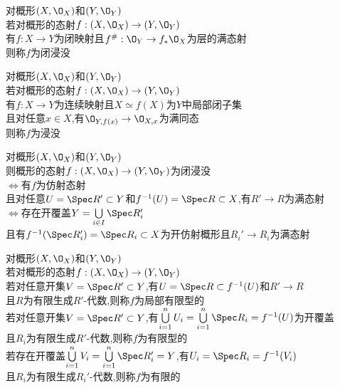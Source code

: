 \begin{dingyi}
对概形$(X,\O_{X})$和$(Y,\O_{Y})$\\
若对概形的态射$f:(X,\O_{X})\to (Y,\O_{Y})$\\
有$f:X\to Y$为闭映射且$f^{\#}:\O_{Y}\to f_{*}\O_{X}$为层的满态射\\
则称$f$为闭浸没
\end{dingyi}

\begin{dingyi}
对概形$(X,\O_{X})$和$(Y,\O_{Y})$\\
若对概形的态射$f:(X,\O_{X})\to (Y,\O_{Y})$\\
有$f:X\to Y$为连续映射且$X\simeq f(X)$为$Y$中局部闭子集\\
且对任意$x\in X$,有$\O_{Y,f(x)}\to\O_{X,x}$为满同态\\
则称$f$为浸没
\end{dingyi}

\begin{dingli}
对概形$(X,\O_{X})$和$(Y,\O_{Y})$\\
则概形的态射$f:(X,\O_{X})\to (Y,\O_{Y})$为闭浸没\\
$\Leftrightarrow$有$f$为仿射态射\\
且对任意$U=\Spec R'\subset Y$和$f^{-1}(U)=\Spec R\subset X$,有$R'\to R$为满态射\\
$\Leftrightarrow$存在开覆盖$Y=\bigcup\limits_{i\in I}\Spec R_i'$\\
且有$f^{-1}(\Spec R_i')=\Spec R_i\subset X$为开仿射概形且$R_i'\to R_i$为满态射
\end{dingli}

\begin{dingyi}
对概形$(X,\O_{X})$和$(Y,\O_{Y})$\\
若对概形的态射$f:(X,\O_{X})\to (Y,\O_{Y})$\\
若对任意开集$V=\Spec R'\subset Y$,有$U=\Spec R\subset f^{-1}(U)$和$R'\to R$\\
且$R$为有限生成$R'$-代数,则称$f$为局部有限型的\\
若对任意开集$V=\Spec R'\subset Y$,有$\bigcup\limits_{i=1}^{n}U_i=\bigcup\limits_{i=1}^{n}\Spec R_i=f^{-1}(U)$为开覆盖\\
且$R_i$为有限生成$R'$-代数,则称$f$为有限型的\\
若存在开覆盖$\bigcup\limits_{i=1}^{n}V_{i}=\bigcup\limits_{i=1}^{n}\Spec R'_{i}=Y$,有$U_i=\Spec R_i=f^{-1}(V_i)$\\
且$R_i$为有限生成$R_i'$-代数,则称$f$为有限的
\end{dingyi}

